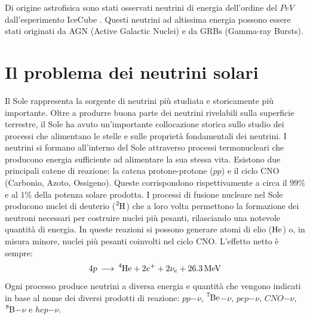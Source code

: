 Di origine astrofisica sono stati osservati neutrini di energia dell'ordine del $\unit{PeV}$ dall'esperimento IceCube \cite{Gaisser:2014foa}. Questi neutrini ad altissima energia possono essere stati originati da AGN (Active Galactic Nuclei) e da GRBs (Gamma-ray Bursts).
\section{Il problema dei neutrini solari}
\label{sec:sole}
Il Sole rappresenta la sorgente di neutrini più studiata e storicamente più importante. Oltre a produrre buona parte dei neutrini rivelabili sulla superficie terrestre, il Sole ha avuto un'importante collocazione storica sullo studio dei processi che alimentano le stelle e sulle proprietà fondamentali dei neutrini. I neutrini si formano all'interno del Sole attraverso processi termonucleari che producono energia sufficiente ad alimentare la sua stessa vita. Esistono due principali catene di reazione: la catena protone-protone ($pp$)  e il ciclo CNO (Carbonio, Azoto, Ossigeno). Queste corrispondono rispettivamente a circa il $99\%$ e al $1\%$ della potenza solare prodotta. I processi di fusione nucleare nel Sole producono nuclei di deuterio ($\ce{^2H}$) che a loro volta permettono la formazione dei neutroni necessari per costruire nuclei più pesanti, rilasciando una notevole quantità di energia. In queste reazioni si possono generare atomi di elio ($\ce{He}$) o, in misura minore, nuclei più pesanti coinvolti nel ciclo CNO. L'effetto netto è sempre: 
\begin{equation}
4p\,\longrightarrow\, \ce{^4He}+2e^++2\nu_e+26.3\,\unit{MeV}
\end{equation}
Ogni processo produce neutrini a diversa energia e quantità che vengono indicati in base al nome dei diversi prodotti di reazione:  $pp$$-\nu$, $\ce{^7Be}$$-\nu$, $pep$$-\nu$, $CNO$$-\nu$, $\ce{^8B}$$-\nu$ e $hep$$-\nu$.


